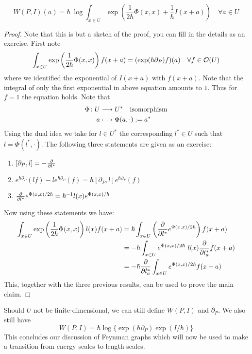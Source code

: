 \begin{prop}
  \begin{equation}W(P,I)(a) = \hbar \ \log \int_{x \in U} \exp\left( \frac{1}{2\hbar} \Phi(x,x) + \frac{1}{\hbar} I(x+a) \right) \quad \forall a \in U\end{equation}
\begin{proof}
  Note that this is but a sketch of the proof, you can fill in the details as an exercise. First note
  \begin{equation}\int_{x \in U} \exp\left( \frac{1}{2\hbar} \Phi(x,x) \right) f(x+a) = (\exp(\hbar \partial_P) f) (a) \quad \forall f \in \mathcal{O}(U)\end{equation}
  where we identified the exponential of $I(x+a)$ with $f(x+a)$. Note that the integral of only the first exponential in above equation amounts to $1$. Thus for $f = 1$ the equation holds. Note that
  \begin{align}
    \Phi \colon U &\longrightarrow U^* \quad \text{isomorphism}\\
    a &\longmapsto \Phi(a, \cdot) := a^*
  \end{align}
  Using the dual idea we take for $l \in U^*$ the corresponding $l^* \in U$ such that $l = \Phi(l^*, \cdot)$. The following three statements are given as an exercise:
  \begin{enumerate}
    \item $[\partial_P, l] = - \frac{\partial }{\partial l^*}$
    \item $e^{\hbar \partial_P}(lf) - l e^{\hbar \partial_P} (f) = \hbar [\partial_P, l] e^{\hbar \partial_P}(f)$
    \item $\frac{\partial }{\partial l^*} e^{\Phi(x,x)/2\hbar} = \hbar^{-1} l(x) e^{\Phi(x,x)/\hbar}$
  \end{enumerate}
  Now using these statements we have:
  \begin{align}
    \int_{x \in U} \exp\left( \frac{1}{2\hbar} \Phi(x,x) \right) l(x) f(x+a) &= \hbar \int_{x \in U} \left( \frac{\partial }{\partial l^*} e^{\Phi(x,x)/2\hbar} \right) f(x+a) \\
    &= - \hbar \int_{x \in U} e^{\Phi(x,x)/2\hbar} \ l(x) \frac{\partial }{\partial l_a^*} f(x+a) \\
    &= - \hbar \frac{\partial }{\partial l_a^*} \int_{x \in U} e^{\Phi(x,x)/2\hbar} f(x+a)
  \end{align}
  This, together with the three previous results, can be used to prove the main claim.
\end{proof}
\end{prop}

Should $U$ not be finite-dimensional, we can still define $W(P,I)$ and $\partial_P$. We also still have
\begin{equation} W(P,I) = \hbar \log\{ \exp(\hbar \partial_P) \exp(I/\hbar) \}\end{equation}
This concludes our discussion of Feynman graphs which will now be used to make a transition from energy scales to length scales.

